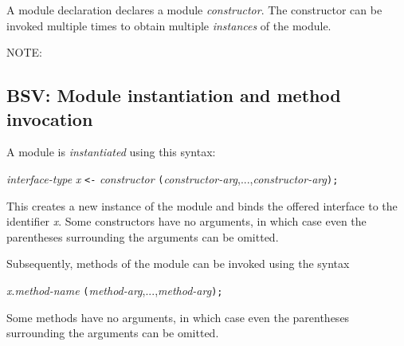 
A module declaration declares a module \emph{constructor}. The
constructor can be invoked multiple times to obtain multiple
\emph{instances} of the module.

\vspace{2ex}

NOTE:


\subsection{BSV: Module instantiation and method invocation}


A module is \emph{instantiated} using this syntax:

\hm \emph{interface-type} \emph{x} {\tt <-} \emph{constructor} {\tt (}\emph{constructor-arg},...,\emph{constructor-arg}{\tt );}

This creates a new instance of the module and binds the offered
interface to the identifier \emph{x}.  Some constructors have no
arguments, in which case even the parentheses surrounding the
arguments can be omitted.

Subsequently, methods of the module can be invoked using the syntax


\hmmmm \emph{x}.\emph{method-name} {\tt (}\emph{method-arg},...,\emph{method-arg}{\tt );}

Some methods have no arguments, in which case even the parentheses
surrounding the arguments can be omitted.

